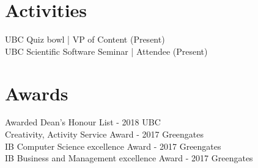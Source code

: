\documentclass[letter]{res}
\begin{document}
\begin{resume}
\vspace{-2mm}
\section{Activities} 
 UBC Quiz bowl | VP of Content (Present) \\
 UBC Scientific Software Seminar | Attendee (Present) \\
 
\vspace{-4mm}
\section{Awards} 
 Awarded Dean’s Honour List - 2018 UBC \\
 Creativity, Activity Service Award - 2017 Greengates \\
 IB Computer Science excellence Award - 2017 Greengates \\
 IB Business and Management excellence Award - 2017 Greengates \\

\end{resume}
\end{document}
